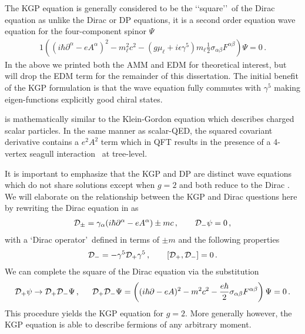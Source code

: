 The KGP equation is generally considered to be the \lq\lq square\rq\rq\ of the Dirac equation as unlike the Dirac or DP equations, it is a second order equation wave equation for the four-component spinor $\Psi$
\begin{alignat}{1}
	\label{kgp:1} \left((i\hbar\partial^{\alpha}-eA^{\alpha})^{2}-m_{\ell}^{2}c^{2}-\left(g\mu_{\ell}+i\epsilon\gamma^{5}\right)m_{\ell}\frac{1}{2}\sigma_{\alpha\beta}F^{\alpha\beta}\right)\Psi=0\,.
\end{alignat}
In the above we printed both the AMM and EDM for theoretical interest, but will drop the EDM term for the remainder of this dissertation. The initial benefit of the KGP formulation is that the wave equation fully commutes with $\gamma^{5}$ making eigen-functions explicitly good chiral states.

 is mathematically similar to the Klein-Gordon equation which describes charged scalar particles. In the same manner as scalar-QED, the squared covariant derivative contains a $e^{2}A^{2}$ term which in QFT results in the presence of a 4-vertex seagull interaction~\citep{Schwartz:2014sze} at tree-level.

It is important to emphasize that the KGP  and DP  are distinct wave equations which do not share solutions except when $g=2$ and both reduce to the Dirac . We will elaborate on the relationship between the KGP and Dirac questions here by rewriting the Dirac equation in  as
\begin{alignat}{1}
	\label{do:1} \mathcal{D}_{\pm}=\gamma_{\alpha}(i\hbar\partial^{\alpha}-eA^{\alpha})\pm mc\,,\qquad
    {\cal D}_{-}\psi=0\,,
\end{alignat}
with a \lq Dirac operator\rq\ defined in terms of $\pm m$ and the following properties
\begin{gather}
    \label{do:2}
    \mathcal{D}_{-}=-\gamma^{5}\mathcal{D}_{+}\gamma^{5}\,,\qquad
    [{\cal D}_{+},{\cal D}_{-}]=0\,.
\end{gather}
We can complete the square of the Dirac equation via the substitution
\begin{alignat}{1}
	\label{eq:kgp:03} \mathcal{D}_{+}\psi\rightarrow\mathcal{D}_{+}\mathcal{D}_{-}\Psi\,,\indent\mathcal{D}_{+}\mathcal{D}_{-}\Psi=\left((i\hbar\partial-eA)^{2}-m^{2}c^{2}-\frac{e\hbar}{2}\sigma_{\alpha\beta}F^{\alpha\beta}\right)\Psi=0\,.
\end{alignat}
This procedure yields the KGP equation for $g=2$. More generally however, the KGP equation is able to describe fermions of any arbitrary moment.

